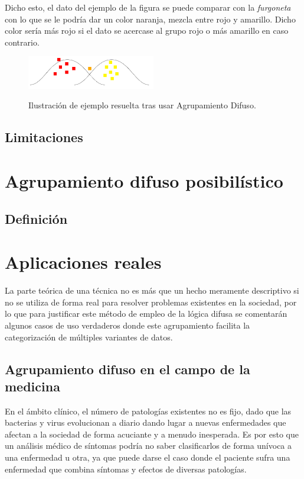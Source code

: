 \documentclass[]{report}
\begin{document}
			Dicho esto, el dato del ejemplo de la figura se puede comparar con la \textit{furgoneta} con lo que se le podría dar un color naranja, mezcla entre rojo y amarillo. Dicho color sería más rojo si el dato se acercase al grupo rojo o más amarillo en caso contrario.
			
			\begin{figure}[h]
				\centering
				\includegraphics[width=0.5\textwidth]{clustering_difuso_solucion.jpg}
				\label{clustering_difuso_solucion}
				\caption{Ilustración de ejemplo resuelta tras usar Agrupamiento Difuso.}
			\end{figure}
		
		\section{Limitaciones}
	
	\chapter{Agrupamiento difuso posibilístico}
	
		\section{Definición}
	
	\chapter{Aplicaciones reales}
	
		La parte teórica de una técnica no es más que un hecho meramente descriptivo si no se utiliza de forma real para resolver problemas existentes en la sociedad, por lo que para justificar este método de empleo de la lógica difusa se comentarán algunos casos de uso verdaderos donde este agrupamiento facilita la categorización de múltiples variantes de datos.\\
		
		\section{Agrupamiento difuso en el campo de la medicina}
		
			En el ámbito clínico, el número de patologías existentes no es fijo, dado que las bacterias y virus evolucionan a diario dando lugar a nuevas enfermedades que afectan a la sociedad de forma acuciante y a menudo inesperada. Es por esto que un análisis médico de síntomas podría no saber clasificarlos de forma unívoca a una enfermedad u otra, ya que puede darse el caso donde el paciente sufra una enfermedad que combina síntomas y efectos de diversas patologías.\\
			
\end{document}
